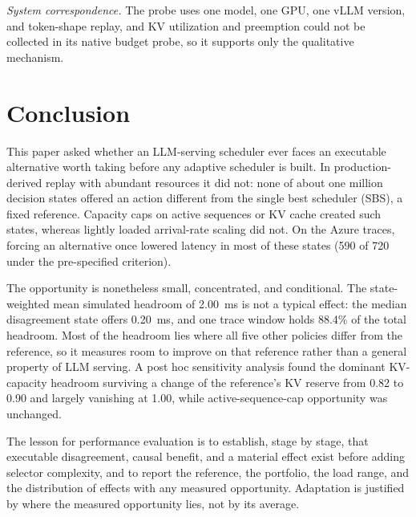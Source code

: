 \documentclass[preprint,12pt]{elsarticle}
\begin{document}
\emph{System correspondence.} The probe uses one model, one GPU, one vLLM
version, and token-shape replay, and KV utilization and preemption could not be
collected in its native budget probe, so it supports only the qualitative
mechanism.

\section{Conclusion}
\label{sec:conclusion}

This paper asked whether an LLM-serving scheduler ever faces an executable alternative worth taking before any adaptive scheduler is built. In production-derived replay with abundant resources it did not: none of about one million decision states offered an action different from the single best scheduler (SBS), a fixed reference. Capacity caps on active sequences or KV cache created such states, whereas lightly loaded arrival-rate scaling did not. On the Azure traces, forcing an alternative once lowered latency in most of these states (590 of 720 under the pre-specified criterion).

The opportunity is nonetheless small, concentrated, and conditional. The state-weighted mean simulated headroom of 2.00~ms is not a typical effect: the median disagreement state offers 0.20~ms, and one trace window holds 88.4\% of the total headroom. Most of the headroom lies where all five other policies differ from the reference, so it measures room to improve on that reference rather than a general property of LLM serving. A post hoc sensitivity analysis found the dominant KV-capacity headroom surviving a change of the reference's KV reserve from 0.82 to 0.90 and largely vanishing at 1.00, while active-sequence-cap opportunity was unchanged.

The lesson for performance evaluation is to establish, stage by stage, that executable disagreement, causal benefit, and a material effect exist before adding selector complexity, and to report the reference, the portfolio, the load range, and the distribution of effects with any measured opportunity. Adaptation is justified by where the measured opportunity lies, not by its average.
\end{document}
